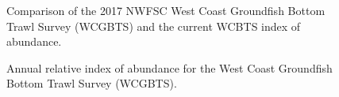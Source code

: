 \documentclass[
]{scrartcl}
\begin{document}
\begin{figure}


\caption{\label{fig-wcgbtsindexcomparison}Comparison of the 2017 NWFSC
West Coast Groundfish Bottom Trawl Survey (WCGBTS) and the current WCBTS
index of abundance.}

\end{figure}%

\begin{figure}


\caption{\label{fig-wcgbtsindex}Annual relative index of abundance for
the West Coast Groundfish Bottom Trawl Survey (WCGBTS).}

\end{figure}%
\end{document}
